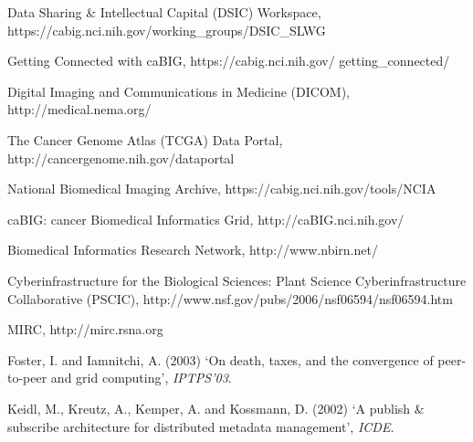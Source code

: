 \documentclass{doublecol-new}
\theoremstyle{TH}{
\newtheorem{lemma}{Lemma}
\newtheorem{theorem}[lemma]{Theorem}
\newtheorem{corrolary}[lemma]{Corrolary}
\newtheorem{conjecture}[lemma]{Conjecture}
\newtheorem{proposition}[lemma]{Proposition}
\newtheorem{claim}[lemma]{Claim}
\newtheorem{stheorem}[lemma]{Wrong Theorem}
\newtheorem{algorithm}{Algorithm}
}
\theoremstyle{THrm}{
\newtheorem{definition}{Definition}[section]
\newtheorem{question}{Question}[section]
\newtheorem{remark}{Remark}
\newtheorem{scheme}{Scheme}
}
\theoremstyle{THhit}{
\newtheorem{case}{Case}[section]
}
\begin{document}
\begin{thebibliography}{10}
 Data
Sharing \& Intellectual Capital (DSIC) Workspace,
https://cabig.nci.nih.gov/working\_groups/DSIC\_SLWG

Getting Connected with caBIG, https://cabig.nci.nih.gov/\break
getting\_connected/

 Digital Imaging and
Communications in Medicine (DICOM), http://medical.nema.org/

The Cancer Genome Atlas (TCGA) Data Portal,
http://cancergenome.nih.gov/dataportal

 National
Biomedical Imaging Archive, https://cabig.nci.nih.gov/tools/NCIA

caBIG: cancer Biomedical Informatics Grid, http://caBIG.nci.nih.gov/

Biomedical Informatics Research Network, http://www.nbirn.net/

Cyberinfrastructure for the Biological Sciences: Plant Science
Cyberinfrastructure Collaborative (PSCIC),
http://www.nsf.gov/pubs/2006/nsf06594/nsf06594.htm

MIRC, http://mirc.rsna.org

 Foster, I. and Iamnitchi, A.
(2003) `On death, taxes, and the convergence of peer-to-peer and
grid computing', {\it IPTPS'03}.

Keidl, M., Kreutz, A., Kemper, A. and Kossmann, D. (2002) `A publish
{\&} subscribe architecture for distributed metadata management',
{\it ICDE}.


\end{thebibliography}
\end{document}
